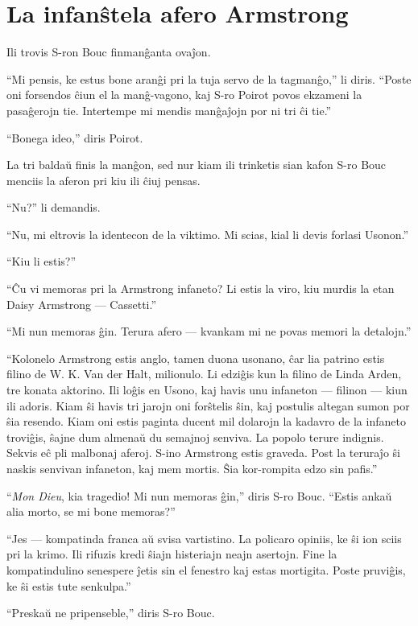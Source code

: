 \chapter[La infanŝtela afero Armstrong ]{La infanŝtela afero Armstrong }


Ili trovis S-ron Bouc finmanĝanta ovaĵon.

``Mi pensis, ke estus bone aranĝi pri la tuja servo de la tagmanĝo,'' li diris. ``Poste oni forsendos ĉiun el la manĝ-vagono, kaj S-ro Poirot povos ekzameni la pasaĝerojn tie. Intertempe mi mendis manĝaĵojn por ni tri ĉi tie.''

``Bonega ideo,'' diris Poirot.

La tri baldaŭ finis la manĝon, sed nur kiam ili trinketis sian kafon S-ro Bouc menciis la aferon pri kiu ili ĉiuj pensas.

``Nu?'' li demandis.

``Nu, mi eltrovis la identecon de la viktimo. Mi scias, kial li devis forlasi Usonon.''

``Kiu li estis?''

``Ĉu vi memoras pri la Armstrong infaneto? Li estis la viro, kiu murdis la etan Daisy Armstrong --- Cassetti.''

``Mi nun memoras ĝin. Terura afero --- kvankam mi ne povas memori la detalojn.''

``Kolonelo Armstrong estis anglo, tamen duona usonano, ĉar lia patrino estis filino de W. K. Van der Halt, milionulo. Li edziĝis kun la filino de Linda Arden, tre konata aktorino. Ili loĝis en Usono, kaj havis unu infaneton --- filinon --- kiun ili adoris. Kiam ŝi havis tri jarojn oni forŝtelis ŝin, kaj postulis altegan sumon por ŝia resendo. Kiam oni estis paginta ducent mil dolarojn la kadavro de la infaneto troviĝis, ŝajne dum almenaŭ du semajnoj senviva. La popolo terure indignis. Sekvis eĉ pli malbonaj aferoj. S-ino Armstrong estis graveda. Post la teruraĵo ŝi naskis senvivan infaneton, kaj mem mortis. Ŝia kor-rompita edzo sin pafis.''

``\emph{Mon Dieu}, kia tragedio! Mi nun memoras ĝin,'' diris S-ro Bouc. ``Estis ankaŭ alia morto, se mi bone memoras?''

``Jes --- kompatinda franca aŭ svisa vartistino. La policaro opiniis, ke ŝi ion sciis pri la krimo. Ili rifuzis kredi ŝiajn histeriajn neajn asertojn. Fine la kompatindulino senespere ĵetis sin el fenestro kaj estas mortigita. Poste pruviĝis, ke ŝi estis tute senkulpa.''

``Preskaŭ ne pripenseble,'' diris S-ro Bouc.

